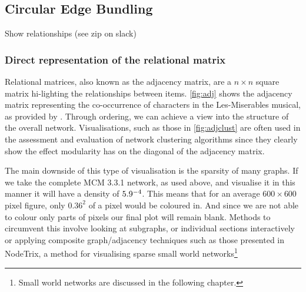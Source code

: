 \subsection{Circular Edge Bundling}

Show relationships (see zip on slack)






\subsubsection{Direct representation of the relational matrix}
Relational matrices, also known as the adjacency matrix, are a $n \times n$ square matrix hi-lighting the relationships between items. \autoref{fig:adj} shows the adjacency matrix representing the co-occurrence of characters in the Les-Miserables musical, as provided by \citep{lesmis}. Through ordering, we can achieve a view into the structure of the overall network. Visualisations, such as those in \autoref{fig:adjclust} are often used in the assessment and evaluation of network clustering algorithms since they clearly show the effect modularity has on the diagonal of the adjacency matrix. 


The main downside of this type of visualisation is the sparsity of many graphs. If we take the complete MCM 3.3.1 network, as used above, and visualise it in this manner it will have a density of $5.9 \time 10^{-4}$. This means that for an average $600 \times 600$ pixel figure, only $0.36^2$ of a pixel would be coloured in. And since we are not able to colour only parts of pixels our final plot will remain blank. Methods to circumvent this involve looking at subgraphs, or individual sections interactively or applying composite graph/adjacency techniques such as those presented in NodeTrix, a method for visualising sparse small world networks\footnote{Small world networks are discussed in the following chapter.} \citep{nodetrix}

